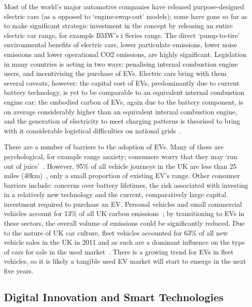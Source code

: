 \documentclass[journal]{IEEEtran}
\begin{document}
Most of the world's major automotive companies have released
purpose-designed electric cars (as a opposed to `engine-swap-out'
models); some have gone so far as to make significant strategic
investment in the concept by releasing an entire electric car range,
for example BMW's i Series range. The direct `pump-to-tire'
environmental benefits of electric cars, lower particulate emissions,
lower noise emissions and lower operational CO2 emissions, are highly
significant. Legislation in many countries is acting in two ways:
penalising internal combustion engine users, and incentivising the
purchase of EVs. Electric cars bring with them several caveats,
however: the capital cost of EVs, predominantly due to current battery
technology, is yet to be comparable to an equivalent internal
combustion engine car; the embodied carbon of EVs, again due to the
battery component, is on average considerably higher than an
equivalent internal combustion engine, and the generation of
electricity to meet charging patterns is theorised to bring with it
considerable logistical difficulties on national
grids~\cite{su-et-al:2011,akhavan-rezai-et-al:2015}.

There are a number of barriers to the adoption of EVs. Many of these
are psychological, for example range anxiety; consumers worry that
they may `run out of
juice'~\cite{oflev:2011,yilmaz+krein:2012}. However, 95\% of all
vehicle journeys in the UK are less than 25 miles
(40km)~\cite{oflev:2011}, only a small proportion of existing EV's
range. Other consumer barriers include: concerns over battery
lifetimes, the risk associated with investing in a relatively new
technology and the current, comparatively large capital investment
required to purchase an EV.  Personal vehicles and small commercial
vehicles account for 13\% of all UK carbon
emissions~\cite{lumsden:2012}; by transitioning to EVs in these
sectors, the overall volume of emissions could be significantly
reduced. Due to the nature of UK car culture, fleet vehicles accounted
for 63\% of all new vehicle sales in the UK in 2011 and as such are a
dominant influence on the type of cars for sale in the used
market~\cite{fleets:2012}. There is a growing trend for EVs in fleet
vehicles, so it is likely a tangible used EV market will start to
emerge in the next five years.


\subsection{Digital Innovation and Smart Technologies}
\end{document}
